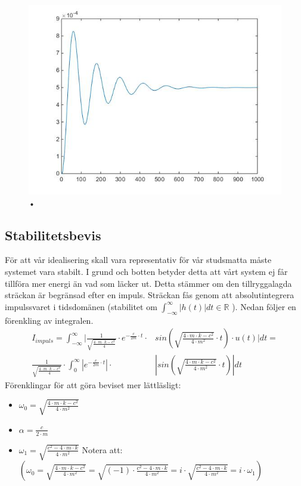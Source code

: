 \documentclass[10pt,a4paper]{article}
\begin{document}
\begin{figure}
\begin{center}
\includegraphics[scale=0.5]{Stegsvar}
\caption{•}
\end{center}
\end{figure}

\subsection{Stabilitetsbevis}
För att vår idealisering skall vara representativ för vår studsmatta måste systemet vara stabilt. I grund och botten betyder detta att vårt system ej får tillföra mer energi än vad som läcker ut. Detta stämmer om den tillryggalagda sträckan är begränsad efter en impuls. Sträckan fås genom att absolutintegrera impulssvaret i tidsdomänen (stabilitet om $\int_{-\infty}^{\infty}|h(t)|dt\in \mathbb{R}$ ). Nedan följer en förenkling av integralen.
\begin{equation}
\begin{split}
I_{impuls}=\int_{-\infty}^{\infty}| \frac{1}{\sqrt{\frac{4 \cdot m \cdot k - c^2}{4}} }  \cdot e^{-\frac{c}{2m} \cdot t} \cdot & sin(\sqrt{\frac{4 \cdot m \cdot k - c^2}{4 \cdot m^2}} \cdot t) \cdot u(t)|dt=\\ \frac{1}{\sqrt{\frac{4 \cdot m \cdot k - c^2}{4}} }  \cdot \int_{0}^{\infty}|e^{-\frac{c}{2m} \cdot t}| \cdot & |sin(\sqrt{\frac{4 \cdot m \cdot k - c^2}{4 \cdot m^2}} \cdot t)|dt
\end{split}
\end{equation}
Förenklingar för att göra beviset mer lättläsligt:
\begin{itemize}
\item $\omega_0=\sqrt{\frac{4 \cdot m \cdot k - c^2}{4 \cdot m^2}}$
\item $\alpha=\frac{c}{2\cdot m}$
\item $\omega_1=\sqrt{\frac{c^2-4 \cdot m \cdot k}{4 \cdot m^2}}$
\newline
\newline 
Notera att: $\left( \omega_0=\sqrt{\frac{4 \cdot m \cdot k-c^2}{4 \cdot m^2}}=\sqrt{(-1)\cdot\frac{c^2-4 \cdot m \cdot k}{4 \cdot m^2}}=i\cdot\sqrt{\frac{c^2-4 \cdot m \cdot k}{4 \cdot m^2}}=i\cdot \omega_1\right)$
\end{itemize}
\end{document}
